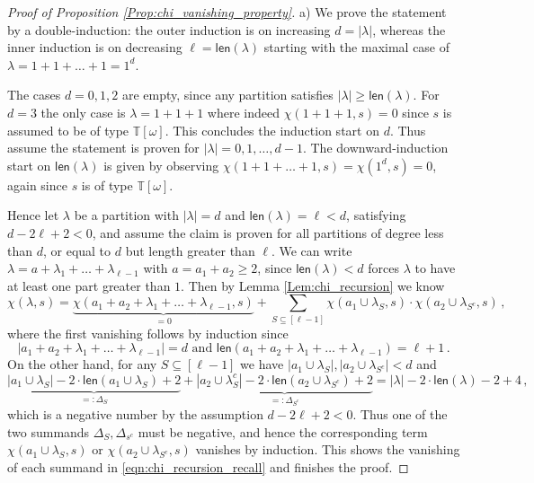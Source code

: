 \documentclass[authorcolumns,numberwithinsect]{no-lipics-v2022}
\begin{document}
\begin{proof}[Proof of Proposition \ref{Prop:chi_vanishing_property}]
a) We prove the statement by a double-induction: the outer induction is on increasing $d=|\lambda|$, whereas the inner induction is on decreasing $\ell = \mathsf{len}(\lambda)$ starting with the maximal case of $\lambda = 1 + 1 + \ldots + 1 = 1^d$.

The cases $d=0,1,2$ are empty, since any partition satisfies $|\lambda|\geq \mathsf{len}(\lambda)$. For $d=3$ the only case is $\lambda=1+1+1$ where indeed $\chi(1+1+1,s)=0$ since $s$ is assumed to be of type $\mathbb{T}[\omega]$. This concludes the induction start on $d$.
Thus assume the statement is proven for $|\lambda|=0,1, \ldots, d-1$. The downward-induction start on $\mathsf{len}(\lambda)$ is given by observing $\chi(1+1+ \ldots + 1,s)=\chi(1^d, s)=0$, again since $s$ is of type $\mathbb{T}[\omega]$. 

Hence let $\lambda$ be a partition with $|\lambda|=d$ and $\mathsf{len}(\lambda)=\ell<d$, satisfying $d - 2 \ell +2<0$, and assume the claim is proven for all partitions of degree less than $d$, or equal to $d$ but length greater than $\ell$. We can write $\lambda = a + \lambda_1 + \ldots + \lambda_{\ell-1}$ with $a=a_1+a_2 \geq 2$, since $\mathsf{len}(\lambda)<d$ forces $\lambda$ to have at least one part greater than $1$. Then by Lemma \ref{Lem:chi_recursion} we know
\begin{equation}  \label{eqn:chi_recursion_recall}
\chi(\lambda, s) = \underbrace{\chi(a_1 + a_2 + \lambda_1 + \ldots + \lambda_{\ell-1}, s)}_{=0} + \sum_{S \subseteq [\ell-1]} \chi(a_1 \cup \lambda_S, s) \cdot \chi(a_2 \cup \lambda_{S^c}, s)\,,
\end{equation}
where the first vanishing follows by induction since 
\[
|a_1+a_2+\lambda_1+\ldots+\lambda_{\ell-1}|=d \text{ and }\mathsf{len}(a_1+a_2+\lambda_1+\ldots+\lambda_{\ell-1})=\ell+1\,.
\]
On the other hand, for any $S \subseteq [\ell-1]$ we have $|a_1 \cup \lambda_S|, |a_2 \cup \lambda_{S^c}|<d$ and
\begin{equation} \label{eqn:Delta_S_Delta_Sc}
\underbrace{|a_1 \cup \lambda_S| - 2 \cdot \mathsf{len}(a_1 \cup \lambda_S)+2}_{=:\Delta_S} + \underbrace{|a_2 \cup \lambda_{S}^c| - 2\cdot \mathsf{len}(a_2 \cup \lambda_{S^c})+2}_{=:\Delta_{S^c}} = |\lambda| - 2 \cdot \mathsf{len}(\lambda)-2+4\,,
\end{equation}
which is a negative number by the assumption $d - 2 \ell +2<0$. Thus one of the two summands $\Delta_S, \Delta_{s^c}$ must be negative, and hence the corresponding term $\chi(a_1 \cup \lambda_S, s)$ or $\chi(a_2 \cup \lambda_{S^c}, s)$ vanishes by induction. This shows the vanishing of each summand in \eqref{eqn:chi_recursion_recall} and finishes the proof.


\end{proof}
\end{document}
